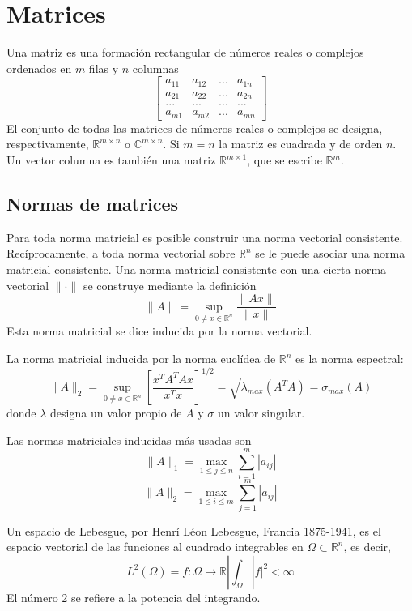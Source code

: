 \section{Matrices}
Una matriz es una formación rectangular de números reales o complejos ordenados en $m$ filas y $n$ columnas
\begin{equation*}
    \begin{bmatrix}
        a_{11} & a_{12} & ... & a_{1n}\\
        a_{21} & a_{22} & ... & a_{2n}\\
        ... & ... & ... & ... \\
        a_{m1} & a_{m2} & ... & a_{mn}
    \end{bmatrix}
\end{equation*} 
El conjunto de todas las matrices de números reales o complejos se designa, respectivamente, $\mathbb{R}^{m \times n}$ o $\mathbb{C}^{m \times n}$. Si $m = n$ la matriz es cuadrada y de orden $n$. Un vector columna es también una matriz $\mathbb{R}^{m \times 1}$, que se escribe $\mathbb{R}^m$.

\subsection{Normas de matrices}
Para toda norma matricial es posible construir una norma vectorial consistente. Recíprocamente, a toda norma vectorial sobre $\mathbb{R}^n$ se le puede asociar una norma matricial consistente. Una norma matricial consistente con una cierta norma vectorial $\|\cdot\|$ se construye mediante la definición
\[ \|A\| = \sup_{0 \neq x \in \mathbb{R}^n} \frac{\|Ax\|}{\|x\|} \]
Esta norma matricial se dice inducida por la norma vectorial.

La norma matricial inducida por la norma euclídea de $\mathbb{R}^n$ es la norma espectral:
\[ \|A\|_2 = \sup_{0 \neq x \in \mathbb{R}^n} [\frac{x^T A^T Ax}{x^T x}]^{1/2} = \sqrt{\lambda_{max}(A^TA)} = \sigma_{max}(A) \]
donde $\lambda$ designa un valor propio de $A$ y $\sigma$ un valor singular.

Las normas matriciales inducidas más usadas son
\[ \|A\|_1 = \max_{1 \leq j \leq n} \sum_{i = 1}^m |a_{ij}|\]
\[ \|A\|_2 = \max_{1 \leq i \leq m} \sum_{j = 1}^m |a_{ij}|\]




Un espacio de Lebesgue, por Henrí Léon Lebesgue, Francia 1875-1941, es el espacio vectorial de las funciones al cuadrado integrables en $\Omega \subset \mathbb{R}^n$, es decir,
\[ L^2(\Omega) = {f: \Omega  \rightarrow \mathbb{R} |\int_\Omega |f|^2 < \infty} \]
El número 2 se refiere a la potencia del integrando.

